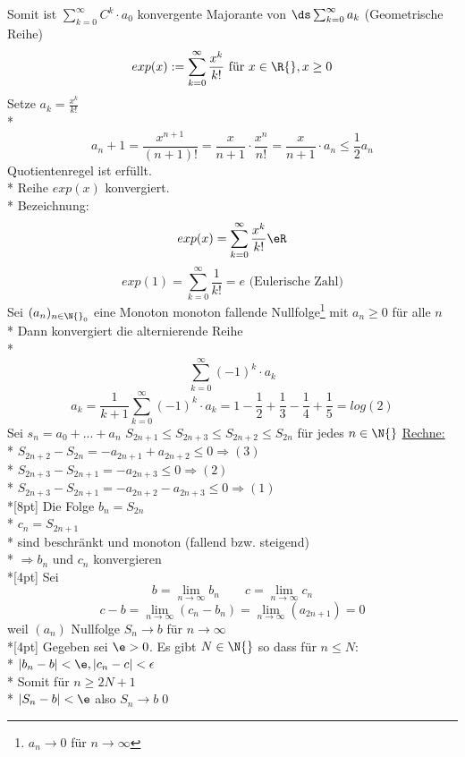 Somit ist $\displaystyle\sum\limits_{k=0}^{\infty} C^k \cdot a_0$ konvergente Majorante von $\ds\sum_{k=0}^{\infty} a_k$ (Geometrische Reihe)
$$exp(x) := \sum\limits_{k=0}^{\infty} \frac{x^k}{k!} \text{ für } x \in \R{}, x \geq 0$$
Setze $a_k = \frac{x^k}{k!}$\\*
$$a_n+1 = \frac{x^{n + 1}}{(n + 1)!} = \frac{x}{n+1} \cdot \frac{x^n}{n!} = \frac{x}{n+1} \cdot a_n \leq \frac{1}{2} a_n$$
\Rarr{} Quotientenregel ist erfüllt.\\*
Reihe $exp(x)$ konvergiert.\\*
Bezeichnung: $$exp(x) = \sum_{k=0}^{\infty} \frac{x^k}{k!} \eR$$
%
$$exp(1) = \sum\limits_{k=0}^{\infty} \frac{1}{k!} = e\text{ (Eulerische Zahl)}$$
Sei $(a_n)_{n \in \N{}_0}$ eine Monoton monoton fallende Nullfolge\footnote{$a_n → 0$ für $n→∞$} mit $a_n \geq 0$ für alle $n$\\*
Dann konvergiert die alternierende Reihe\\*
$$\sum_{k=0}^{\infty} (-1)^k · a_k$$
\bsp
$$a_k = \frac{1}{k + 1} \sum_{k=0}^{\infty} (-1)^k · a_k = 1 - \frac{1}{2} + \frac{1}{3} - \frac{1}{4} + \frac{1}{5}= log(2)$$
\bew
Sei $s_n = a_0 + ... + a_n$
$S_{2n + 1} \leq S_{2n + 3} \leq S_{2n + 2} \leq S_{2n}$ für jedes $n \in \N{}$
%
\ul{Rechne:}\\*
$S_{2n + 2} - S_{2n} = - a_{2n + 1} + a_{2n + 2} \leq 0 \Rightarrow (3)$\\*
$S_{2n + 3} - S_{2n + 1} = - a_{2n + 3} \leq 0 \Rightarrow (2)$\\*
$S_{2n + 3} - S_{2n + 1} = - a_{2n + 2} - a_{2n + 3} \leq 0 \Rightarrow (1)$\\*[8pt]
Die Folge $b_n = S_{2n}$\\*
\phantom{Die Folge }$c_n = S_{2n + 1}$\\*
sind beschränkt und monoton (fallend bzw. steigend)\\*
$\Rightarrow b_n \text{ und } c_n$ konvergieren\\*[4pt]
Sei $$b = \lim_{n \to \infty} b_n \qquad c = \lim_{n \to \infty} c_n$$
$$c - b = \lim_{n \to \infty} (c_n - b_n) = \lim_{n \to \infty} (a_{2n + 1}) = 0$$
weil $(a_n)$ Nullfolge
$S_n \to b$ für $n \to \infty$\\*[4pt]
Gegeben sei $\e > 0$. Es gibt $N \in \N{}$ so dass für $n \leq N$:\\*
$|b_n - b| < \e, |c_n - c| < \epsilon$\\*
Somit für $n \geq 2N+1 $\\*
$|S_n - b| < \e$ also $S_n \to b$\qed